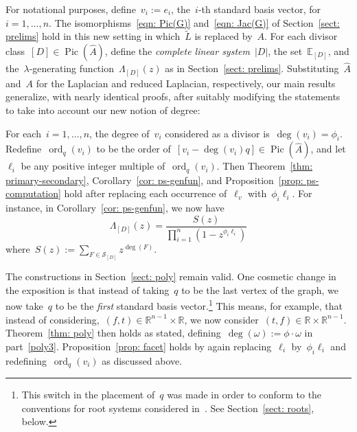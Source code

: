 \documentclass{amsart}
\DeclareMathOperator{\Pic}{Pic}
\DeclareMathOperator{\ord}{ord}
\newcommand{\secondary}{\mathcal{S}}
\newcommand{\R}{\mathbb{R}}
\newcommand{\E}{\mathbb{E}}
\newcommand{\tL}{\tilde{L}}
\newcommand{\wA}{\widehat{A}}
\begin{document}
For notational purposes, define~$v_i:=e_i$, the~$i$-th standard basis vector,
for ~$i=1,\dots,n$. The isomorphisms~\eqref{eqn:
Pic(G)} and~\eqref{eqn: Jac(G)} of Section~\ref{sect: prelims} hold in this new
setting in which~$\tL$ is replaced by~$A$.  For each divisor
class~$[D]\in\Pic(\wA)$, define the {\em complete linear system}~$|D|$, the
set~$\E_{[D]}$, and the~$\lambda$-generating function~$\Lambda_{[D]}(z)$ as in
Section~\ref{sect: prelims}.  Substituting~$\wA$ and~$A$ for the Laplacian and
reduced Laplacian, respectively, our main results generalize, with nearly
identical proofs, after suitably modifying the statements to take into account
our new notion of degree:
\smallskip

  For each~$i=1,\dots,n$,  the
degree of~$v_i$ considered as a divisor is~$\deg(v_i)=\phi_i$.
Redefine~$\ord_q(v_i)$ to be the order of~$[v_i-\deg(v_i)q]\in\Pic(\wA)$, and
let~$\ell_i$ be any positive integer multiple of~$\ord_q(v_i)$.  Then
Theorem~\ref{thm: primary-secondary}, Corollary~\ref{cor: ps-genfun}, and
Proposition~\ref{prop: ps-computation} hold after replacing each occurrence
of~$\ell_{v}$ with~$\phi_i\ell_i$.  For instance, in Corollary~\ref{cor:
ps-genfun}, we now have
\begin{equation}\label{eqn: ps-genfun}
  \Lambda_{[D]}(z)=\frac{S(z)}{\prod_{i=1}^{n}(1-z^{\phi_i\ell_i})}
\end{equation}
where~$S(z):=\sum_{F\in\secondary_{[D]}}z^{\deg(F)}$.
\smallskip

  The constructions in Section~\ref{sect: poly} remain
valid. One cosmetic change in the exposition is that instead of taking~$q$ to be
the last vertex of the graph, we now take~$q$ to be the {\em first} standard
basis vector.\footnote{This switch in the placement of~$q$ was made in order to
  conform to the conventions for root systems considered in~\cite{BKR}.  See
Section~\ref{sect: roots}, below.}  This means, for example, that instead of
considering,~$(f,t)\in\R^{n-1}\times\R$, we now
consider~$(t,f)\in\R\times\R^{n-1}$.  Theorem~\ref{thm: poly} then
holds as stated, defining~$\deg(\omega):=\phi\cdot\omega$ in part~\ref{poly3}.
Proposition~\ref{prop: facet} holds by again replacing~$\ell_i$
by~$\phi_i\ell_i$ and redefining~$\ord_q(v_i)$ as discussed above.
\smallskip
\end{document}
